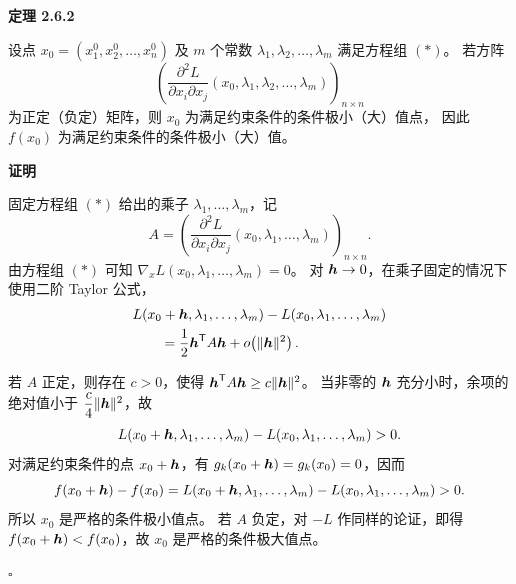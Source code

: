 \textbf{定理 2.6.2}

设点 $x_0=(x_1^0,x_2^0,\ldots,x_n^0)$ 及 $m$ 个常数
$\lambda_1,\lambda_2,\ldots,\lambda_m$ 满足方程组 $(*)$。
若方阵
\[
\left(
\frac{\partial^2L}{\partial x_i\partial x_j}
(x_0,\lambda_1,\lambda_2,\ldots,\lambda_m)
\right)_{n\times n}
\]
为正定（负定）矩阵，则 $x_0$ 为满足约束条件的条件极小（大）值点，
因此 $f(x_0)$ 为满足约束条件的条件极小（大）值。






\textbf{证明}

固定方程组 $(*)$ 给出的乘子
$\lambda_1,\ldots,\lambda_m$，记
\[
A=\left(
\frac{\partial^2L}{\partial x_i\partial x_j}
(x_0,\lambda_1,\ldots,\lambda_m)
\right)_{n\times n}.
\]
由方程组 $(*)$ 可知
$\nabla_xL(x_0,\lambda_1,\ldots,\lambda_m)=0$。
对 $\boldsymbol{h}\to0$，在乘子固定的情况下使用二阶 Taylor 公式，
\[
\begin{aligned}
&L(x_0+\boldsymbol{h},\lambda_1,\ldots,\lambda_m)
 -L(x_0,\lambda_1,\ldots,\lambda_m)\\
&\qquad=
\frac12\boldsymbol{h}^{\mathsf T}A\boldsymbol{h}
+o\!\left(\lVert\boldsymbol{h}\rVert^2\right).
\end{aligned}
\]

若 $A$ 正定，则存在 $c>0$，使得
$\boldsymbol{h}^{\mathsf T}A\boldsymbol{h}\ge c\lVert\boldsymbol{h}\rVert^2$。
当非零的 $\boldsymbol{h}$ 充分小时，余项的绝对值小于
$\dfrac c4\lVert\boldsymbol{h}\rVert^2$，故
\[
L(x_0+\boldsymbol{h},\lambda_1,\ldots,\lambda_m)
 -L(x_0,\lambda_1,\ldots,\lambda_m)>0.
\]
对满足约束条件的点 $x_0+\boldsymbol{h}$，有
$g_k(x_0+\boldsymbol{h})=g_k(x_0)=0$，因而
\[
f(x_0+\boldsymbol{h})-f(x_0)
=L(x_0+\boldsymbol{h},\lambda_1,\ldots,\lambda_m)
 -L(x_0,\lambda_1,\ldots,\lambda_m)>0.
\]
所以 $x_0$ 是严格的条件极小值点。
若 $A$ 负定，对 $-L$ 作同样的论证，即得
$f(x_0+\boldsymbol{h})<f(x_0)$，故 $x_0$ 是严格的条件极大值点。


$\square$


